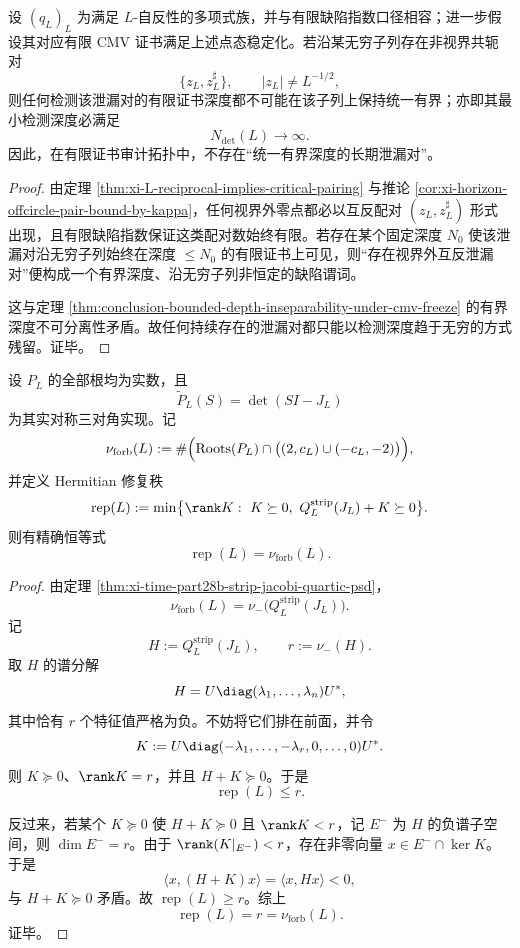\begin{theorem}[自反泄漏对的无穷深度驱逐]\label{thm:conclusion-selfreciprocal-leakage-pairs-expelled-to-infinite-depth}
设 \((q_L)_L\) 为满足 \(L\)-自反性的多项式族，并与有限缺陷指数口径相容；进一步假设其对应有限 CMV 证书满足上述点态稳定化。若沿某无穷子列存在非视界共轭对
\[
\{z_L,z_L^\sharp\},
\qquad
|z_L|\neq L^{-1/2},
\]
则任何检测该泄漏对的有限证书深度都不可能在该子列上保持统一有界；亦即其最小检测深度必满足
\[
N_{\det}(L)\to\infty.
\]
因此，在有限证书审计拓扑中，不存在“统一有界深度的长期泄漏对”。
\end{theorem}
\begin{proof}
由定理 \ref{thm:xi-L-reciprocal-implies-critical-pairing} 与推论 \ref{cor:xi-horizon-offcircle-pair-bound-by-kappa}，任何视界外零点都必以互反配对 \((z_L,z_L^\sharp)\) 形式出现，且有限缺陷指数保证这类配对数始终有限。若存在某个固定深度 \(N_0\) 使该泄漏对沿无穷子列始终在深度 \(\le N_0\) 的有限证书上可见，则“存在视界外互反泄漏对”便构成一个有界深度、沿无穷子列非恒定的缺陷谓词。

这与定理 \ref{thm:conclusion-bounded-depth-inseparability-under-cmv-freeze} 的有界深度不可分离性矛盾。故任何持续存在的泄漏对都只能以检测深度趋于无穷的方式残留。证毕。
\end{proof}

\begin{theorem}\label{thm:conclusion-jacobi-shadow-minimal-psd-repair-rank-equals-forbidden-root-count}
设 \(P_L\) 的全部根均为实数，且
\[
\widetilde P_L(S)=\det(SI-J_L)
\]
为其实对称三对角实现。记
\[
\nu_{\mathrm{forb}}(L)
:=
\#\Bigl(\mathrm{Roots}(P_L)\cap\bigl((2,c_L)\cup(-c_L,-2)\bigr)\Bigr),
\]
并定义 Hermitian 修复秩
\[
\operatorname{rep}(L)
:=
\min\bigl\{\rank K:\ K\succeq0,\ Q_L^{\mathrm{strip}}(J_L)+K\succeq0\bigr\}.
\]
则有精确恒等式
\[
\operatorname{rep}(L)=\nu_{\mathrm{forb}}(L).
\]
\end{theorem}
\begin{proof}
由定理 \ref{thm:xi-time-part28b-strip-jacobi-quartic-psd}，
\[
\nu_{\mathrm{forb}}(L)
=
\nu_-\!\bigl(Q_L^{\mathrm{strip}}(J_L)\bigr).
\]
记
\[
H:=Q_L^{\mathrm{strip}}(J_L),
\qquad
r:=\nu_-(H).
\]
取 \(H\) 的谱分解
\[
H=U\diag(\lambda_1,\dots,\lambda_n)U^\ast,
\]
其中恰有 \(r\) 个特征值严格为负。不妨将它们排在前面，并令
\[
K:=U\diag(-\lambda_1,\dots,-\lambda_r,0,\dots,0)U^\ast.
\]
则 \(K\succeq 0\)、\(\rank K=r\)，并且 \(H+K\succeq0\)。于是
\[
\operatorname{rep}(L)\le r.
\]

反过来，若某个 \(K\succeq0\) 使 \(H+K\succeq0\) 且 \(\rank K<r\)，记 \(E^-\) 为 \(H\) 的负谱子空间，则 \(\dim E^-=r\)。由于 \(\rank(K|_{E^-})<r\)，存在非零向量 \(x\in E^-\cap\ker K\)。于是
\[
\langle x,(H+K)x\rangle
=
\langle x,Hx\rangle
<
0,
\]
与 \(H+K\succeq0\) 矛盾。故 \(\operatorname{rep}(L)\ge r\)。综上
\[
\operatorname{rep}(L)=r=\nu_{\mathrm{forb}}(L).
\]
证毕。
\end{proof}

